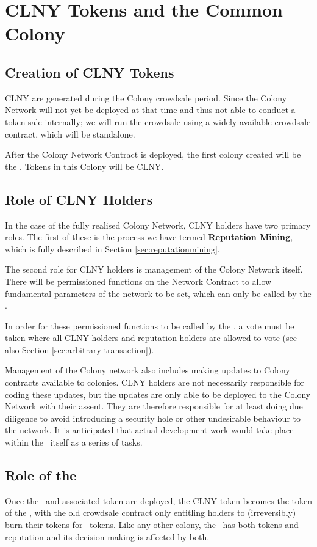 \section{CLNY Tokens and the Common Colony}\label{sec:clny}

\subsection{Creation of CLNY Tokens}
CLNY are generated during the Colony crowdsale period. Since the Colony Network will not yet be deployed at that time and thus not able to conduct a token sale internally; we will run the crowdsale using a widely-available crowdsale contract, which will be standalone.

After the Colony Network Contract is deployed, the first colony created will be the \rc. Tokens in this Colony will be CLNY. 

\subsection{Role of CLNY Holders}
In the case of the fully realised Colony Network, CLNY holders have two primary roles. The first of these is the process we have termed \textbf{Reputation Mining}, which is fully described in Section \ref{sec:reputationmining}.

The second role for CLNY holders is management of the Colony Network itself. There will be permissioned functions on the Network Contract to allow fundamental parameters of the network to be set, which can only be called by the \rc.

In order for these permissioned functions to be called by the \rc, a vote must be taken where all CLNY holders and reputation holders are allowed to vote (see also Section \ref{sec:arbitrary-transaction}).

Management of the Colony network also includes making updates to Colony contracts available to colonies. CLNY holders are not necessarily responsible for coding these updates, but the updates are only able to be deployed to the Colony Network with their assent. They are therefore responsible for at least doing due diligence to avoid introducing a security hole or other undesirable behaviour to the network. It is anticipated that actual development work would take place within the \rc\ itself as a series of tasks.


\subsection{Role of the \rc}
Once the \rc\ and associated token are deployed, the CLNY token becomes the token of the \rc, with the old crowdsale contract only entitling holders to (irreversibly) burn their tokens for \rc\ tokens. Like any other colony, the \rc\ has both tokens and reputation and its decision making is affected by both.

